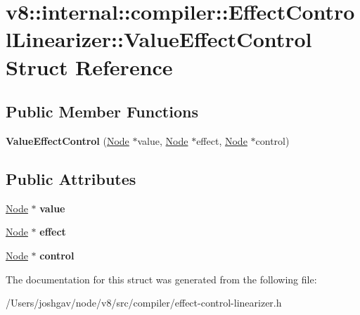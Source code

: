 \hypertarget{structv8_1_1internal_1_1compiler_1_1_effect_control_linearizer_1_1_value_effect_control}{}\section{v8\+:\+:internal\+:\+:compiler\+:\+:Effect\+Control\+Linearizer\+:\+:Value\+Effect\+Control Struct Reference}
\label{structv8_1_1internal_1_1compiler_1_1_effect_control_linearizer_1_1_value_effect_control}
\subsection*{Public Member Functions}
\begin{DoxyCompactItemize}
\item 
{\bfseries Value\+Effect\+Control} (\hyperlink{classv8_1_1internal_1_1compiler_1_1_node}{Node} $\ast$value, \hyperlink{classv8_1_1internal_1_1compiler_1_1_node}{Node} $\ast$effect, \hyperlink{classv8_1_1internal_1_1compiler_1_1_node}{Node} $\ast$control)\hypertarget{structv8_1_1internal_1_1compiler_1_1_effect_control_linearizer_1_1_value_effect_control_a4b8a8e454ec47488237de9aaeee88ab5}{}\label{structv8_1_1internal_1_1compiler_1_1_effect_control_linearizer_1_1_value_effect_control_a4b8a8e454ec47488237de9aaeee88ab5}

\end{DoxyCompactItemize}
\subsection*{Public Attributes}
\begin{DoxyCompactItemize}
\item 
\hyperlink{classv8_1_1internal_1_1compiler_1_1_node}{Node} $\ast$ {\bfseries value}\hypertarget{structv8_1_1internal_1_1compiler_1_1_effect_control_linearizer_1_1_value_effect_control_aa541cc0a8705add1f3955877c667fe17}{}\label{structv8_1_1internal_1_1compiler_1_1_effect_control_linearizer_1_1_value_effect_control_aa541cc0a8705add1f3955877c667fe17}

\item 
\hyperlink{classv8_1_1internal_1_1compiler_1_1_node}{Node} $\ast$ {\bfseries effect}\hypertarget{structv8_1_1internal_1_1compiler_1_1_effect_control_linearizer_1_1_value_effect_control_a69639884cd18f6bcfdf770dc9ef9a642}{}\label{structv8_1_1internal_1_1compiler_1_1_effect_control_linearizer_1_1_value_effect_control_a69639884cd18f6bcfdf770dc9ef9a642}

\item 
\hyperlink{classv8_1_1internal_1_1compiler_1_1_node}{Node} $\ast$ {\bfseries control}\hypertarget{structv8_1_1internal_1_1compiler_1_1_effect_control_linearizer_1_1_value_effect_control_a834c69bf234be28b9d1a117bf54b2cb5}{}\label{structv8_1_1internal_1_1compiler_1_1_effect_control_linearizer_1_1_value_effect_control_a834c69bf234be28b9d1a117bf54b2cb5}

\end{DoxyCompactItemize}


The documentation for this struct was generated from the following file\+:\begin{DoxyCompactItemize}
\item 
/\+Users/joshgav/node/v8/src/compiler/effect-\/control-\/linearizer.\+h\end{DoxyCompactItemize}
